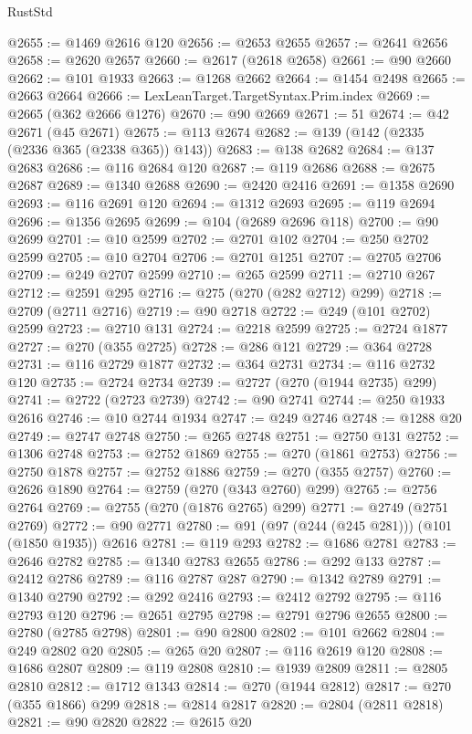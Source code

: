 \begin{lexlean}{RustStd}
\begin{coremodule}
@2655 := @1469 @2616 @120
@2656 := @2653 @2655
@2657 := @2641 @2656
@2658 := @2620 @2657
@2660 := @2617 (@2618 @2658)
@2661 := @90 @2660
@2662 := @101 @1933
@2663 := @1268 @2662
@2664 := @1454 @2498
@2665 := @2663 @2664
@2666 := LexLeanTarget.TargetSyntax.Prim.index
@2669 := @2665 (@362 @2666 @1276)
@2670 := @90 @2669
@2671 := 51
@2674 := @42 @2671 (@45 @2671)
@2675 := @113 @2674
@2682 := @139 (@142 (@2335 (@2336 @365 (@2338 @365)) @143))
@2683 := @138 @2682
@2684 := @137 @2683
@2686 := @116 @2684 @120
@2687 := @119 @2686
@2688 := @2675 @2687
@2689 := @1340 @2688
@2690 := @2420 @2416
@2691 := @1358 @2690
@2693 := @116 @2691 @120
@2694 := @1312 @2693
@2695 := @119 @2694
@2696 := @1356 @2695
@2699 := @104 (@2689 @2696 @118)
@2700 := @90 @2699
@2701 := @10 @2599
@2702 := @2701 @102
@2704 := @250 @2702 @2599
@2705 := @10 @2704
@2706 := @2701 @1251
@2707 := @2705 @2706
@2709 := @249 @2707 @2599
@2710 := @265 @2599
@2711 := @2710 @267
@2712 := @2591 @295
@2716 := @275 (@270 (@282 @2712) @299)
@2718 := @2709 (@2711 @2716)
@2719 := @90 @2718
@2722 := @249 (@101 @2702) @2599
@2723 := @2710 @131
@2724 := @2218 @2599
@2725 := @2724 @1877
@2727 := @270 (@355 @2725)
@2728 := @286 @121
@2729 := @364 @2728
@2731 := @116 @2729 @1877
@2732 := @364 @2731
@2734 := @116 @2732 @120
@2735 := @2724 @2734
@2739 := @2727 (@270 (@1944 @2735) @299)
@2741 := @2722 (@2723 @2739)
@2742 := @90 @2741
@2744 := @250 @1933 @2616
@2746 := @10 @2744 @1934
@2747 := @249 @2746
@2748 := @1288 @20
@2749 := @2747 @2748
@2750 := @265 @2748
@2751 := @2750 @131
@2752 := @1306 @2748
@2753 := @2752 @1869
@2755 := @270 (@1861 @2753)
@2756 := @2750 @1878
@2757 := @2752 @1886
@2759 := @270 (@355 @2757)
@2760 := @2626 @1890
@2764 := @2759 (@270 (@343 @2760) @299)
@2765 := @2756 @2764
@2769 := @2755 (@270 (@1876 @2765) @299)
@2771 := @2749 (@2751 @2769)
@2772 := @90 @2771
@2780 := @91 (@97 (@244 (@245 @281))) (@101 (@1850 @1935)) @2616
@2781 := @119 @293
@2782 := @1686 @2781
@2783 := @2646 @2782
@2785 := @1340 @2783 @2655
@2786 := @292 @133
@2787 := @2412 @2786
@2789 := @116 @2787 @287
@2790 := @1342 @2789
@2791 := @1340 @2790
@2792 := @292 @2416
@2793 := @2412 @2792
@2795 := @116 @2793 @120
@2796 := @2651 @2795
@2798 := @2791 @2796 @2655
@2800 := @2780 (@2785 @2798)
@2801 := @90 @2800
@2802 := @101 @2662
@2804 := @249 @2802 @20
@2805 := @265 @20
@2807 := @116 @2619 @120
@2808 := @1686 @2807
@2809 := @119 @2808
@2810 := @1939 @2809
@2811 := @2805 @2810
@2812 := @1712 @1343
@2814 := @270 (@1944 @2812)
@2817 := @270 (@355 @1866) @299
@2818 := @2814 @2817
@2820 := @2804 (@2811 @2818)
@2821 := @90 @2820
@2822 := @2615 @20

\end{coremodule}
\end{lexlean}
